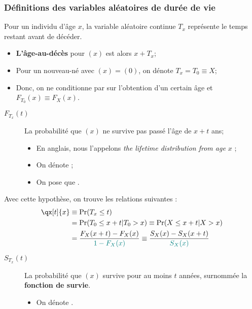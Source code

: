 \documentclass[10pt, french]{article}
\begin{document}
\begin{multicols*}{3}
\subsubsection*{Définitions des variables aléatoires de durée de vie}
\begin{definitionNOHFILLsub}
Pour un individu d'âge $x$, la variable aléatoire continue $T_{x}$ représente le temps restant avant de décéder.\\

\begin{itemize}
	\item	\textbf{L'âge-au-décès} pour $(x)$ est alors $x + T_{x}$;
	\item	Pour un nouveau-né avec $(x) = (0)$, on dénote $T_{x} = T_{0} \equiv X$;
	\item	Donc, on ne conditionne par sur l'obtention d'un certain âge et $F_{T_{0}}(x) \equiv F_{X}(x)$.
\end{itemize}
\tcbline
\begin{description}
	\item[$F_{T_{x}}(t)$]	La probabilité que $(x)$ ne survive pas passé l'âge de $x + t$ ans;
		\begin{itemize}
		\item	En anglais, nous l'appelons \og \textit{the lifetime distribution from age $x$} \fg{};	
		\item	On dénote ;
		\item	On pose que .
		\end{itemize}
\end{description}

Avec cette hypothèse, on trouve les relations suivantes :
\begin{align*}
	\qx[t]{x}
	&\equiv	\Pr(T_{x} \leq t)  	\\
	&=	\Pr(T_{0} \leq x + t | T_{0} > x) 
	\equiv	\Pr(X \leq x + t | X > x) \\
	&=	\frac{F_{X}(x + t) - F_{X}(x)}{\textcolor{teal}{1 - F_{X}(x)}}
	\equiv	\frac{S_{X}(x) - S_{X}(x + t)}{\textcolor{teal}{S_{X}(x)}}
\end{align*}

\begin{description}
	\item[$S_{T_{x}}(t)$]	La probabilité que $(x)$ survive pour au moins $t$ années, surnommée la \textbf{fonction de survie}.
		\begin{itemize}[leftmargin = *]
		\item	On dénote .
		\end{itemize}
\end{description}


\end{definitionNOHFILLsub}
\end{multicols*}
\end{document}
